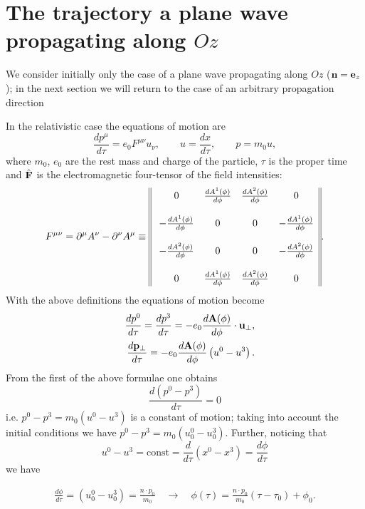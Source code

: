 \section{The trajectory a plane wave propagating along $Oz$}

{\color{red}We consider initially only the case of a plane wave propagating along $Oz$ (${\bf n} = {\bf e}_z$); in the next section we will return to the case of an arbitrary propagation direction}

In the relativistic case the equations of motion are
\begin{equation}
    \frac{dp^{\mu}}{d\tau}=e_0F^{\mu\nu}u_{\nu},\qquad  u=\frac{d  x}{d\tau},\qquad  p=m_0 u,
\end{equation}
where \(m_0\), \(e_0\) are the rest mass and charge of the particle, \(\tau\) is the proper time and \(\hat{\bf F}\) is  the electromagnetic four-tensor of the field intensities:
\begin{equation}
    F^{\mu\nu}=\partial^{\mu}A^{\nu}-\partial^{\nu}A^{\mu}\equiv\;\vline\,\vline\begin{array}{cccc}0&\frac{dA^1(\phi)}{d\phi}&\frac{dA^2(\phi)}{d\phi}&0\\\\-\frac{dA^1(\phi)}{d\phi}&0&0&-\frac{dA^1(\phi)}{d\phi}\\\\-\frac{dA^2(\phi)}{d\phi}&0&0&-\frac{dA^2(\phi)}{d\phi}\\\\0&\frac{dA^1(\phi)}{d\phi}&\frac{dA^2(\phi)}{d\phi}&0\end{array}\vline\,\vline.
\end{equation}
With the above definitions the equations of motion become
\begin{eqnarray}
    &&\frac{dp^0}{d\tau}=\frac{dp^3}{d\tau}=-e_0\frac{d{\bf A}(\phi)}{d\phi}\cdot{\bf u}_{\perp},\label{ep1}\\
    &&\frac{d{\bf p}_{\perp}}{d\tau}=-e_0\frac{d{\bf A}(\phi)}{d\phi}\left(u^0-u^3\right).\label{ep2}
\end{eqnarray}
From the first  of the above formulae one obtains
\begin{equation}
    \frac{d(p^0-p^3)}{d\tau}=0
\end{equation}
i.e. \(p^0-p^3=m_0(u^0-u^3)\) is a constant of motion; taking into account the initial conditions we have \(p^0-p^3=m_0(u^0_0-u^3_0)\). Further, noticing that
\begin{equation}
    u^0-u^3={\mathrm{const}}=\frac{d}{d\tau}\left(x^0-x^3\right)=\frac{d\phi}{d\tau}\label{dphidtau}
\end{equation}
we have
\begin{importantbox}
    \begin{align}
        \frac{d\phi}{d\tau} = (u^0_0-u^3_0)=\frac{n\cdot p_0}{m_0}\quad \longrightarrow \quad \phi(\tau) = \frac{n\cdot p_0}{m_0}(\tau-\tau_0)+\phi_0.
    \end{align}
\end{importantbox}

